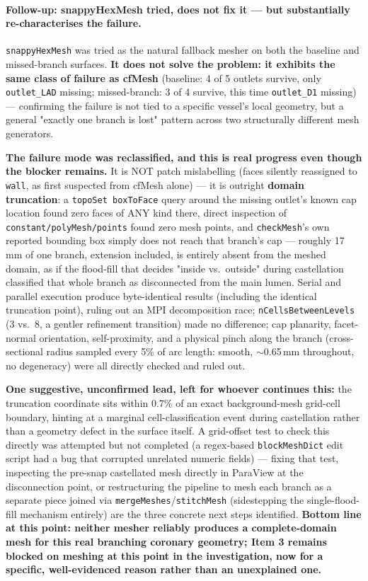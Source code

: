 \documentclass[11pt]{article}
\begin{document}
\paragraph{Follow-up: snappyHexMesh tried, does not fix it --- but substantially re-characterises the
failure.} \texttt{snappyHexMesh} was tried as the natural fallback mesher on both the baseline and
missed-branch surfaces. \textbf{It does not solve the problem: it exhibits the same class of failure
as cfMesh} (baseline: 4 of 5 outlets survive, only \texttt{outlet\_\allowbreak{}LAD} missing; missed-branch: 3 of 4
survive, this time \texttt{outlet\_\allowbreak{}D1} missing) --- confirming the failure is not tied to a specific
vessel's local geometry, but a general "exactly one branch is lost" pattern across two structurally
different mesh generators.

\textbf{The failure mode was reclassified, and this is real progress even though the blocker
remains.} It is NOT patch mislabelling (faces silently reassigned to \texttt{wall}, as first suspected
from cfMesh alone) --- it is outright \textbf{domain truncation}: a \texttt{topoSet boxToFace} query
around the missing outlet's known cap location found zero faces of ANY kind there, direct inspection of
\texttt{constant/\allowbreak{}polyMesh/\allowbreak{}points} found zero mesh points, and \texttt{checkMesh}'s own reported bounding
box simply does not reach that branch's cap --- roughly 17\,mm of one branch, extension included, is
entirely absent from the meshed domain, as if the flood-fill that decides "inside vs.\ outside" during
castellation classified that whole branch as disconnected from the main lumen. Serial and parallel
execution produce byte-identical results (including the identical truncation point), ruling out an MPI
decomposition race; \texttt{nCellsBetweenLevels} (3 vs.\ 8, a gentler refinement transition) made no
difference; cap planarity, facet-normal orientation, self-proximity, and a physical pinch along the
branch (cross-sectional radius sampled every 5\% of arc length: smooth, $\sim$0.65\,mm throughout, no
degeneracy) were all directly checked and ruled out.

\textbf{One suggestive, unconfirmed lead, left for whoever continues this:} the truncation coordinate
sits within 0.7\% of an exact background-mesh grid-cell boundary, hinting at a marginal
cell-classification event during castellation rather than a geometry defect in the surface itself. A
grid-offset test to check this directly was attempted but not completed (a regex-based
\texttt{blockMeshDict} edit script had a bug that corrupted unrelated numeric fields) --- fixing that
test, inspecting the pre-snap castellated mesh directly in ParaView at the disconnection point, or
restructuring the pipeline to mesh each branch as a separate piece joined via
\texttt{mergeMeshes}/\texttt{stitchMesh} (sidestepping the single-flood-fill mechanism entirely) are the
three concrete next steps identified. \textbf{Bottom line at this point: neither mesher reliably produces
a complete-domain mesh for this real branching coronary geometry; Item 3 remains blocked on meshing at this point in the investigation, now
for a specific, well-evidenced reason rather than an unexplained one.}
\end{document}
